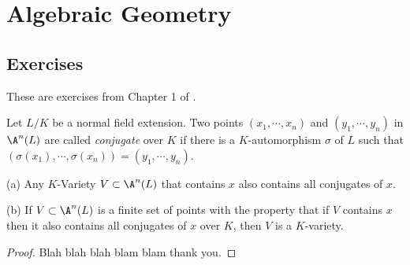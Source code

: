 \documentclass[oneside,12pt]{amsart}
\begin{document}

\section{Algebraic Geometry}


\subsection{Exercises}
These are exercises from Chapter 1 of \cite{Kunz_Book}.

\begin{exercise}
Let $L/K$ be a normal field extension. Two points $(x_1,\cdots,x_n)$ and $(y_1,\cdots,y_n)$ in
$\A^n(L)$ are called \emph{conjugate} over $K$ if there is a $K$-automorphism $\sigma$ of $L$
such that $(\sigma(x_1),\cdots,\sigma(x_n))=(y_1,\cdots,y_n)$.

(a) Any $K$-Variety $V\subset\A^n(L)$ that contains $x$ also contains all conjugates of $x$.

(b) If $V\subset\A^n(L)$ is a finite set of points with the property that if $V$ contains $x$
then it also contains all conjugates of $x$ over $K$, then $V$ is a $K$-variety.
\end{exercise}
\begin{proof}
Blah blah blah blam blam thank you.
\end{proof}





\end{document}
